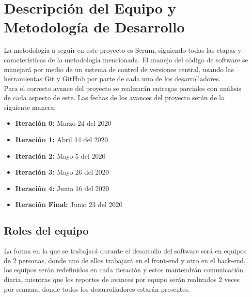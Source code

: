 \documentclass[a4paper,12 pt]{article}
\begin{document}
\section{Descripción del Equipo y Metodología de Desarrollo}

La metodología a seguir en este proyecto es Scrum, siguiendo todas las etapas y
características de la metodología mencionada. El manejo del código de software
se manejará por medio de un sistema de control de versiones central, usando las
herramientas Git y GitHub por parte de cada uno de los desarrolladores. \\

Para el correcto avance del proyecto se realizarán entregas parciales con
análisis de cada aspecto de este. Las fechas de los avances del proyecto serán
de la siguiente manera:

\begin{itemize}
    \item \textbf{Iteración 0:} Marzo 24 del 2020
    \item \textbf{Iteración 1:} Abril 14 del 2020
    \item \textbf{Iteración 2:} Mayo 5 del 2020
    \item \textbf{Iteración 3:} Mayo 26 del 2020
    \item \textbf{Iteración 4:} Junio 16 del 2020
    \item \textbf{Iteración Final:} Junio 23 del 2020
\end{itemize}{}

\subsection{Roles del equipo}

La forma en la que se trabajará durante el desarrollo del software será en
equipos de 2 personas, donde uno de ellos trabajará en el front-end y otro en el
back-end, los equipos serán redefinidos en cada iteración y estos mantendrán
comunicación diaria, mientras que los reportes de avances por equipo serán
realizados 2 veces por semana, donde todos los desarrolladores estarán
presentes.
\end{document}
